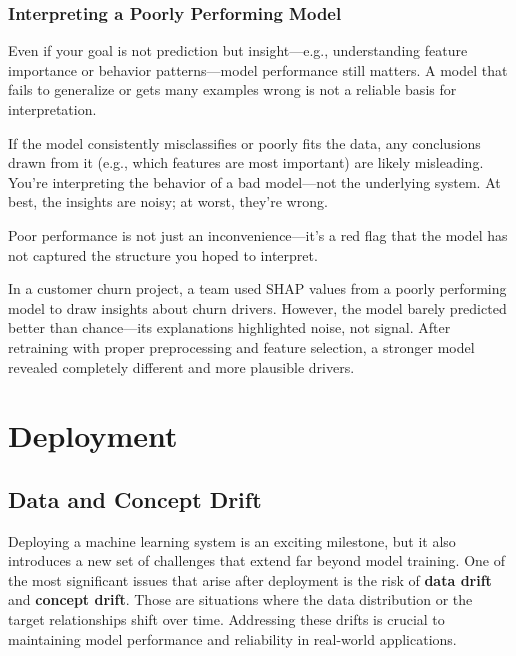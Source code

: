 \documentclass[12pt,openany]{book}
\begin{document}
\section{Interpreting a Poorly Performing Model}

Even if your goal is not prediction but insight—e.g., understanding feature importance or behavior patterns—model performance still matters. A model that fails to generalize or gets many examples wrong is not a reliable basis for interpretation.

If the model consistently misclassifies or poorly fits the data, any conclusions drawn from it (e.g., which features are most important) are likely misleading. You're interpreting the behavior of a bad model—not the underlying system. At best, the insights are noisy; at worst, they're wrong.

Poor performance is not just an inconvenience—it’s a red flag that the model has not captured the structure you hoped to interpret.

\begin{examplebox}
In a customer churn project, a team used SHAP values from a poorly performing model to draw insights about churn drivers. However, the model barely predicted better than chance—its explanations highlighted noise, not signal. After retraining with proper preprocessing and feature selection, a stronger model revealed completely different and more plausible drivers.
\end{examplebox}





\part{Deployment}

\chapter{Data and Concept Drift}

Deploying a machine learning system is an exciting milestone, but it also introduces a new set of challenges that extend far beyond model training. One of the most significant issues that arise after deployment is the risk of \textbf{data drift} and \textbf{concept drift}. Those are situations where the data distribution or the target relationships shift over time. Addressing these drifts is crucial to maintaining model performance and reliability in real-world applications.
\end{document}
